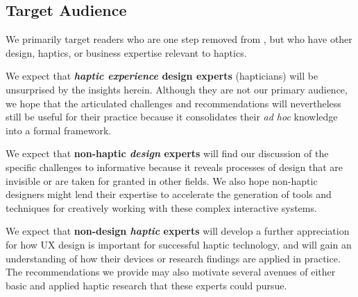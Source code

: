 \subsection{Target Audience}
\noindent
We primarily target readers who are one step removed from \haxd, but who have other design, haptics, or business expertise relevant to haptics. %

We expect that \textbf{\textit{haptic experience} design experts} (hapticians) will be unsurprised by the insights herein. %
Although they are not our primary audience, we hope that the articulated challenges and recommendations  will nevertheless still be useful for their practice because it consolidates their \textit{ad hoc} knowledge into a formal framework.


We expect that \textbf{non-haptic \textit{design} experts} will find our discussion of the specific challenges to \haxd informative because it reveals processes of design that are invisible or are taken for granted in other fields.
We also hope non-haptic designers might lend their expertise to accelerate
the generation of tools and techniques for creatively working with these complex interactive systems.

We expect that \textbf{non-design \textit{haptic} experts} will develop a further appreciation for how UX design is important for successful haptic technology, and will gain an understanding of how their devices or research findings are applied in practice.
The recommendations we provide may also motivate several avenues of either basic and applied haptic research that these experts could pursue.

